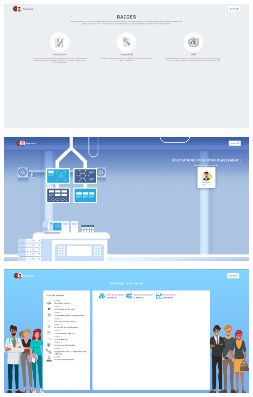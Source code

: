 \begin{center}
\includegraphics[scale=0.15]{images/5} 
\end{center}



\begin{center}
\includegraphics[scale=0.15]{images/4} 
\end{center}


\begin{center}
\includegraphics[scale=0.12]{images/3} 
\end{center}





